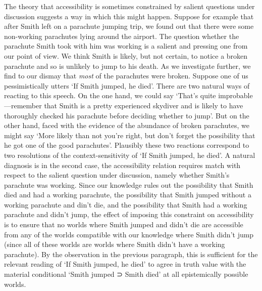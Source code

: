 \documentclass[If.tex]{subfiles}
\begin{document}
The theory that accessibility is sometimes constrained by salient questions under discussion suggests a way in which this might happen.  Suppose for example that after Smith left on a parachute jumping trip, we found out that there were some non-working parachutes lying around the airport.  The question whether the parachute Smith took with him was working is a salient and pressing one from our point of view.  We think Smith is likely, but not certain, to notice a broken parachute and so is unlikely to jump to his death.  As we investigate further, we find to our dismay that \emph{most} of the parachutes were broken.  Suppose one of us pessimistically utters ‘If Smith jumped, he died’.  There are two natural ways of reacting to this speech.  On the one hand, we could say ‘That's quite improbable---remember that Smith is a pretty experienced skydiver and is likely to have thoroughly checked his parachute before deciding whether to jump’.  But on the other hand, faced with the evidence of the abundance of broken parachutes, we might say ‘More likely than not you're right, but don't forget the possibility that he got one of the good parachutes’.  Plausibly these two reactions correspond to two resolutions of the context-sensitivity of ‘If Smith jumped, he died’.  A natural diagnosis is in the second case, the accessibility relation requires match with respect to the salient question under discussion, namely whether Smith's parachute was working.  Since our knowledge rules out the possibility that Smith died and had a working parachute, the possibility that Smith jumped without a working parachute and din't die, and the possibility that Smith had a working parachute and didn't jump, the effect of imposing this constraint on accessibility is to ensure that no worlds where Smith jumped and didn't die are accessible from any of the worlds compatible with our knowledge where Smith didn't jump (since all of these worlds are worlds where Smith didn't have a working parachute).  By the observation in the previous paragraph, this is sufficient for the relevant reading of ‘If Smith jumped, he died’ to agree in truth value with the material conditional ‘Smith jumped ⊃ Smith died’ at all epistemically possible worlds.
\end{document}
